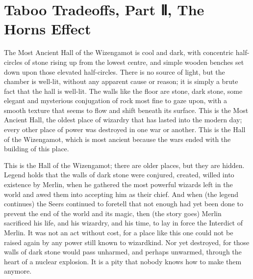 \chapter{Taboo Tradeoffs, Part Ⅱ, The Horns Effect}

The Most Ancient Hall of the Wizengamot is cool and dark, with
concentric half-circles of stone rising up from the lowest centre, and
simple wooden benches set down upon those elevated half-circles. There
is no source of light, but the chamber is well-lit, without any apparent
cause or reason; it is simply a brute fact that the hall is well-lit.
The walls like the floor are stone, dark stone, some elegant and
mysterious conjugation of rock most fine to gaze upon, with a smooth
texture that seems to flow and shift beneath its surface. This is the
Most Ancient Hall, the oldest place of wizardry that has lasted into the
modern day; every other place of power was destroyed in one war or
another. This is the Hall of the Wizengamot, which is most ancient
because the wars ended with the building of this place.

This is the Hall of the Wizengamot; there are older places, but they are
hidden. Legend holds that the walls of dark stone were conjured,
created, willed into existence by Merlin, when he gathered the most
powerful wizards left in the world and awed them into accepting him as
their chief. And when (the legend continues) the Seers continued to
foretell that not enough had yet been done to prevent the end of the
world and its magic, then (the story goes) Merlin sacrificed his life,
and his wizardry, and his time, to lay in force the Interdict of Merlin.
It was not an act without cost, for a place like this one could not be
raised again by any power still known to wizardkind. Nor yet destroyed,
for those walls of dark stone would pass unharmed, and perhaps unwarmed,
through the heart of a nuclear explosion. It is a pity that nobody knows
how to make them anymore.

